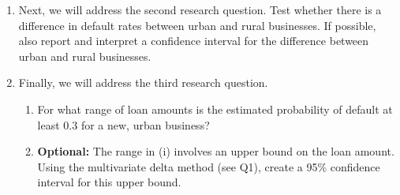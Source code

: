 \documentclass[11pt]{article}
\begin{document}
\begin{enumerate}
\begin{enumerate}
\item Next, we will address the second research question. Test whether there is a difference in default rates between urban and rural businesses. If possible, also report and interpret a confidence interval for the difference between urban and rural businesses.


\item Finally, we will address the third research question. 
\begin{enumerate}
\item For what range of loan amounts is the estimated probability of default at least 0.3 for a new, urban business?
\item \textbf{Optional:} The range in (i) involves an upper bound on the loan amount. Using the multivariate delta method (see Q1), create a 95\% confidence interval for this upper bound.
\end{enumerate}

\end{enumerate} 
\end{enumerate}
\end{document}
